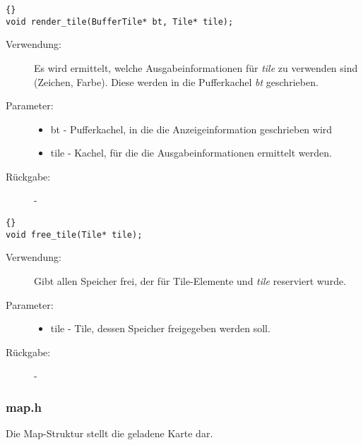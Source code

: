 \documentclass[11pt,a4paper,notitlepage]{report}
\begin{document}
		\begin{lstlisting}[caption=render\_tile]{}
void render_tile(BufferTile* bt, Tile* tile);
		\end{lstlisting}
		
	\begin{description}
		\item[Verwendung:] Es wird ermittelt, welche Ausgabeinformationen für \textit{tile} zu verwenden sind (Zeichen, Farbe). Diese werden in die Pufferkachel \textit{bt} geschrieben.
		\item[Parameter:] \hfill
		\begin{itemize}
			\item bt - Pufferkachel, in die die Anzeigeinformation geschrieben wird
			\item tile - Kachel, für die die Ausgabeinformationen ermittelt werden.
		\end{itemize}
		\item[Rückgabe:] -
	\end{description}
	
		\begin{lstlisting}[caption=free\_tile]{}
void free_tile(Tile* tile);
		\end{lstlisting}
		
	\begin{description}
		\item[Verwendung:] Gibt allen Speicher frei, der für Tile-Elemente und \textit{tile} reserviert wurde.
		\item[Parameter:] \hfill
		\begin{itemize}
			\item tile - Tile, dessen Speicher freigegeben werden soll.
		\end{itemize}
		\item[Rückgabe:] -
	\end{description}
	
	\newpage
	\subsubsection*{map.h}
	Die Map-Struktur stellt die geladene Karte dar.
	
\end{document}
